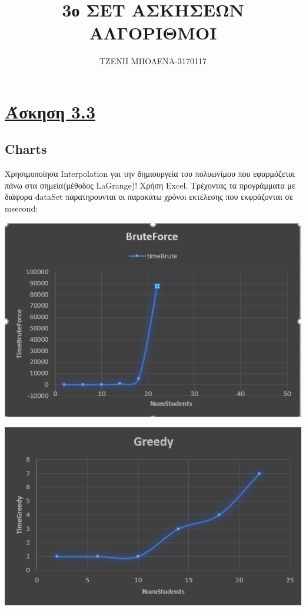 \documentclass[12pt]{article}
\title{3ο ΣΕΤ ΑΣΚΗΣΕΩΝ ΑΛΓΟΡΙΘΜΟΙ}
\author{\color{Mahogany}ΤΖΕΝΗ ΜΠΟΛΕΝΑ-3170117}
\date{}
\begin{document}
\maketitle

\section{\underline{Άσκηση 3.3}}
\subsection{Charts}
Χρησιμοποίησα Interpolation γαι την δημιουργεία του πολυωνίμου που εφαρμόζεται πάνω στα σημεία(μέθοδος LaGrange)! Χρήση Excel.
Τρέχοντας τα προγράμματα με διάφορα dataSet παρατηρουνται οι παρακάτω χρόνοι εκτέλεσης που εκφράζονται σε msecond:
 \begin{center}
	\includegraphics[scale = 0.7]{Brute.png}
\end{center}

 \begin{center}
	\includegraphics[scale = 0.7]{Greedy.png}
\end{center}
\end{document}
